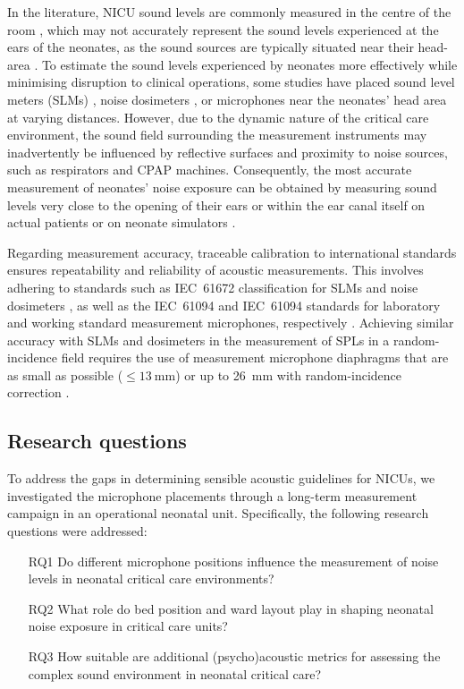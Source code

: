 In the literature, NICU sound levels are commonly measured in the centre of the room \citep{Darcy2008,Lahav2015,Parra2017}, which may not accurately represent the sound levels experienced at the ears of the neonates, as the sound sources are typically situated near their head-area \cite{Darbyshire2019}. To estimate the sound levels experienced by neonates more effectively while minimising disruption to clinical operations, some studies have placed sound level meters (SLMs) \citep{Krueger2007,Romeu2016,Shoemark2016}, noise dosimeters \citep{Parra2017,Smith2018}, or microphones \citep{Park2017neonatal,Bertsch2020,Reuter2023} near the neonates' head area at varying distances. However, due to the dynamic nature of the critical care environment, the sound field surrounding the measurement instruments may inadvertently be influenced by reflective surfaces and proximity to noise sources, such as respirators and CPAP machines. Consequently, the most accurate measurement of neonates' noise exposure can be obtained by measuring sound levels very close to the opening of their ears or within the ear canal itself on actual patients \citep{Surenthiran2003} or on neonate simulators \citep{Bertsch2020,Reuter2023}. 

 Regarding measurement accuracy, traceable calibration to international standards ensures repeatability and reliability of acoustic measurements. This involves adhering to standards such as IEC~61672 classification for SLMs and noise dosimeters \citep{IEC6167212013}, as well as the IEC~61094 and IEC~61094 standards for laboratory and working standard measurement microphones, respectively \citep{IEC61904-1,IEC6109441996}. Achieving similar accuracy with SLMs and dosimeters in the measurement of SPLs in a random-incidence field requires the use of measurement microphone diaphragms that are as small as possible ($\le\SI{13}{\milli\meter}$) or up to \SI{26}{\milli\meter} with random-incidence correction \citep{ISO3382-1}.

\subsection{Research questions} \label{sec:rq}

To address the gaps in determining sensible acoustic guidelines for NICUs, we investigated the microphone placements through a long-term measurement campaign in an operational neonatal unit. Specifically, the following research questions were addressed:
\begin{itemize}
    \item[RQ1] Do different microphone positions influence the measurement of noise levels in neonatal critical care environments?
    \item[RQ2] What role do bed position and ward layout play in shaping neonatal noise exposure in critical care units?
    \item[RQ3] How suitable are additional (psycho)acoustic metrics for assessing the complex sound environment in neonatal critical care?
\end{itemize}


